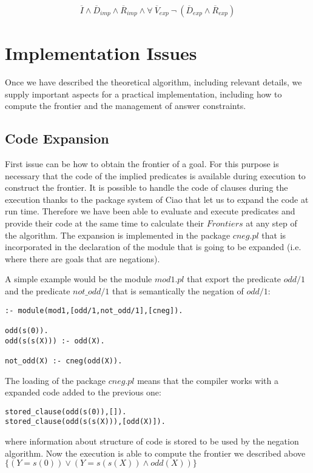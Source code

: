 \documentclass{llncs}
\begin{document}
\begin{itemize}
           \[\overline{I} \wedge \overline{D}_{imp}
           \wedge \overline{R}_{imp} \wedge \forall~
           \overline{V}_{exp}~ \neg~(\overline{D}_{exp} \wedge
           \overline{R}_{exp})\]

         \end{itemize}


    


\section{Implementation Issues}
\label{implementation}

Once we have described the theoretical algorithm, including relevant
details, we supply important aspects for a practical implementation,
including how to compute the frontier and the management of answer
constraints.


\subsection{Code Expansion}
\label{expansion}

First issue can be how to obtain 
the frontier of a goal. For this purpose is necessary that the code of
the implied predicates is available during execution to construct the
frontier. It is possible to handle the code of clauses during the
execution thanks to the package system of Ciao
\cite{ciao-modules-cl2000} that let us to expand the code at run time.
Therefore we have been able to evaluate and execute predicates and
provide their code at the same time to calculate their $Frontiers$ at
any step of the algorithm. The expansion is implemented in the package
$cneg.pl$ that is incorporated in the declaration of the module that
is going to be expanded (i.e. where there are goals that are
negations).

A simple example would be the module $mod1.pl$ that export the
predicate $odd/1$ and the predicate $not\_odd/1$ that is semantically
the negation of $odd/1$:
\begin{verbatim}
:- module(mod1,[odd/1,not_odd/1],[cneg]).

odd(s(0)).
odd(s(s(X))) :- odd(X).

not_odd(X) :- cneg(odd(X)).
\end{verbatim}
The loading of the package $cneg.pl$ means 
that the compiler works with a expanded code added to the previous one:
\begin{verbatim}
stored_clause(odd(s(0)),[]).
stored_clause(odd(s(s(X))),[odd(X)]).
\end{verbatim}
where information about structure of code is stored to be used by the
negation algorithm. Now the execution is able to compute the frontier
we described above $\{ ( Y=s(0) ) \vee ( Y=s(s(X)) \wedge odd(X) ) \}$
\end{document}
